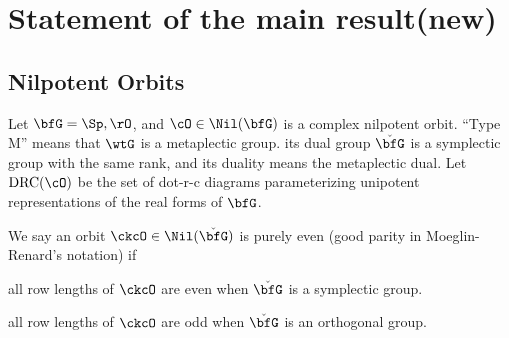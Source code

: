 \documentclass[12pt,a4paper]{amsart}
\def\ckbfG{\check{\bfG}}
\numberwithin{equation}{section}
\theoremstyle{remark}
\def\drc{\mathrm{DRC}}
\begin{document}
\section{Statement of the main result(new)}
\subsection{Nilpotent Orbits}
Let $\bfG = \Sp,  \rO$, and $\cO\in \Nil(\bfG)$ is a complex nilpotent
orbit.
``Type M'' means that $\wtG$ is a metaplectic group. its dual group $\ckbfG$ is a symplectic
group with the same rank, and its duality means the metaplectic dual.
Let $\drc(\cO)$ be the set of dot-r-c diagrams parameterizing unipotent
representations of the real forms of $\bfG$.

We say an orbit $\ckcO\in \Nil(\ckbfG)$ is purely even (good parity in
Moeglin-Renard's notation) if
\begin{des}
 \item[] all row lengths of $\ckcO$ are even when $\ckbfG$ is a symplectic group.
 \item[]  all row lengths of $\ckcO$ are odd when $\ckbfG$ is an orthogonal group.
\end{des}

\end{document}
